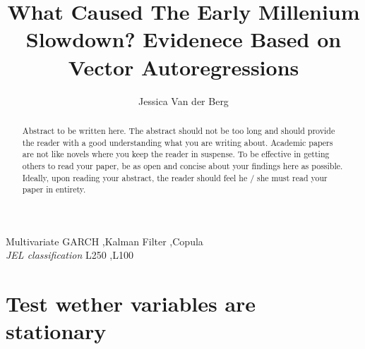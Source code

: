 \documentclass[11pt,preprint, authoryear]{elsarticle}
\numberwithin{equation}{section}
\numberwithin{figure}{section}
\numberwithin{table}{section}
\begin{document}
\begin{frontmatter}  %

\title{What Caused The Early Millenium Slowdown? Evidenece Based on
Vector Autoregressions}





\author[Add1]{Jessica Van der Berg}





\address[Add1]{20190565}


\begin{abstract}
\small{
Abstract to be written here. The abstract should not be too long and
should provide the reader with a good understanding what you are writing
about. Academic papers are not like novels where you keep the reader in
suspense. To be effective in getting others to read your paper, be as
open and concise about your findings here as possible. Ideally, upon
reading your abstract, the reader should feel he / she must read your
paper in entirety.
}
\end{abstract}

\vspace{1cm}

\begin{keyword}
\footnotesize{
Multivariate GARCH \sep Kalman Filter \sep Copula \\ \vspace{0.3cm}
\textit{JEL classification} L250 \sep L100
}
\end{keyword}
\vspace{0.5cm}
\end{frontmatter}



\pagestyle{fancy}
\chead{}
\lfoot{}
\lhead{}
\cfoot{}


\headsep 35pt %




\hypertarget{test-wether-variables-are-stationary}{%
\section{\texorpdfstring{Test wether variables are stationary
\label{stationary}}{Test wether variables are stationary }}\label{test-wether-variables-are-stationary}}
\end{document}

